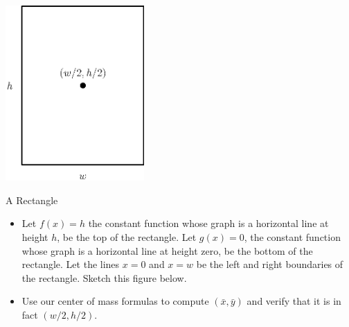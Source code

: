 	\begin{center}
		\includegraphics[width=150pt]{ChapterGeom/Figures/rectangle.eps}
	\end{center}
\begin{exercise}{A Rectangle \Coffeecup \Coffeecup}

\begin{itemize}

\item Let $f(x)=h$ the constant function whose graph is a horizontal line at height $h$, be the top of the rectangle.  Let $g(x)=0$, the constant function whose graph is a horizontal line at height zero, be the bottom of the rectangle.  Let the lines $x=0$ and $x=w$ be the left and right boundaries of the rectangle.  Sketch this figure below.

\vspace*{2in}

\item Use our center of mass formulas to compute $(\bar{x},\bar{y})$ and verify that it is in fact $(w/2,h/2)$.


\end{itemize}
\end{exercise}

